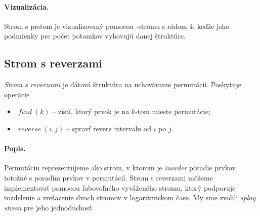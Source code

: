 
\paragraph{Vizualizácia.}
Strom s prstom je vizualizovaný pomocou \Bp-stromu s rádom 4, keďže jeho podmienky pre počet potomkov vyhovujú
danej štruktúre.
\def\find{$\mathop{find}(k)$}

\subsection{Strom s reverzami}
\emph{Strom s reverzami} je dátová štruktúra na uchovávanie permutácií. 
Poskytuje operácie 
\begin{itemize}
\item $\mathop{\mathit{find}}(k)$ -- zistí, ktorý prvok je na $k$-tom mieste permutácie;
\item $\mathop{\mathit{reverse}}(i,j)$ -- spraví reverz intervalu od $i$ po $j$.
\end{itemize}

\paragraph{Popis.}
Permutáciu reprezentujeme ako strom, v ktorom je \emph{inorder} poradie prvkov totožné 
s poradím prvkov v permutácií. Strom s reverzami môžeme implementovať pomocou ľubovoľného 
vyváženého stromu, ktorý podporuje rozdelenie a zreťazenie dvoch stromov v logaritmickom čase. 
My sme zvolili \emph{splay strom} pre jeho jednoduchosť. 

